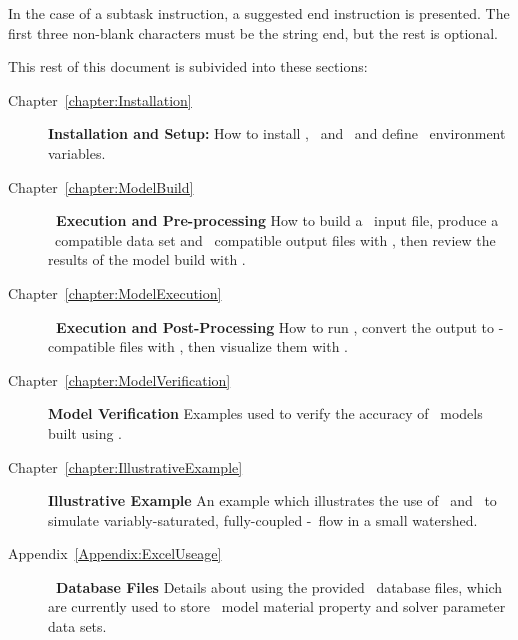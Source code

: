 In the case of a subtask instruction, a suggested \textsf{end} instruction is presented.  The first three non-blank characters must be the string \textsf{end}, but the rest is optional.

This rest of this document is subivided into these sections:
\begin{description}
    \item[Chapter~\ref{chapter:Installation}]\textbf{Installation and Setup:} How to install \mut, \mfus\ and \tecplot\ and define \windows\ environment variables.
     \item[Chapter~\ref{chapter:ModelBuild}]\textbf{\mut\ Execution and Pre-processing} How to build a \mut\ input file, produce a \mfus\ compatible data set and \tecplot\ compatible output files with \mut, then review the results of the model build with \tecplot.
    \item[Chapter~\ref{chapter:ModelExecution}]\textbf{\mfus\ Execution and Post-Processing} How to run \mfus, convert the output to \tecplot-compatible files with \mut, then visualize them with \tecplot.
    \item[Chapter~\ref{chapter:ModelVerification}]\textbf{Model Verification} Examples used to verify the accuracy of \mfus\ models built using \mut.
    \item[Chapter~\ref{chapter:IllustrativeExample}]\textbf{Illustrative Example} An example which illustrates the use of \mut\ and \mfus\ to simulate variably-saturated, fully-coupled   \gwf-\swf\ flow in a small watershed.
    \item[Appendix~\ref{Appendix:ExcelUseage}]\textbf{\excel\ Database Files} Details about using the provided \excel\ database files, which are currently used to store \mfus\ model material property and solver parameter data sets.
        \end{description}

